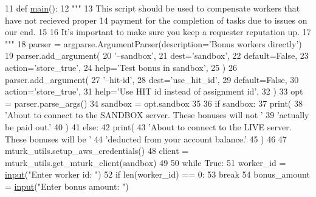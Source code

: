 \begin{DoxyCode}
11 \textcolor{keyword}{def }\hyperlink{namespaceparlai_1_1mturk_1_1scripts_1_1bonus__workers_aafc7a350f4abb5524c1b7477b3fc2bda}{main}():
12     \textcolor{stringliteral}{"""}
13 \textcolor{stringliteral}{    This script should be used to compensate workers that have not recieved proper}
14 \textcolor{stringliteral}{    payment for the completion of tasks due to issues on our end.}
15 \textcolor{stringliteral}{}
16 \textcolor{stringliteral}{    It's important to make sure you keep a requester reputation up.}
17 \textcolor{stringliteral}{    """}
18     parser = argparse.ArgumentParser(description=\textcolor{stringliteral}{'Bonus workers directly'})
19     parser.add\_argument(
20         \textcolor{stringliteral}{'--sandbox'},
21         dest=\textcolor{stringliteral}{'sandbox'},
22         default=\textcolor{keyword}{False},
23         action=\textcolor{stringliteral}{'store\_true'},
24         help=\textcolor{stringliteral}{'Test bonus in sandbox'},
25     )
26     parser.add\_argument(
27         \textcolor{stringliteral}{'--hit-id'},
28         dest=\textcolor{stringliteral}{'use\_hit\_id'},
29         default=\textcolor{keyword}{False},
30         action=\textcolor{stringliteral}{'store\_true'},
31         help=\textcolor{stringliteral}{'Use HIT id instead of assignment id'},
32     )
33     opt = parser.parse\_args()
34     sandbox = opt.sandbox
35 
36     \textcolor{keywordflow}{if} sandbox:
37         print(
38             \textcolor{stringliteral}{'About to connect to the SANDBOX server. These bonuses will not '}
39             \textcolor{stringliteral}{'actually be paid out.'}
40         )
41     \textcolor{keywordflow}{else}:
42         print(
43             \textcolor{stringliteral}{'About to connect to the LIVE server. These bonuses will be '}
44             \textcolor{stringliteral}{'deducted from your account balance.'}
45         )
46 
47     mturk\_utils.setup\_aws\_credentials()
48     client = mturk\_utils.get\_mturk\_client(sandbox)
49 
50     \textcolor{keywordflow}{while} \textcolor{keyword}{True}:
51         worker\_id = \hyperlink{namespaceparlai_1_1mturk_1_1core_1_1dev_1_1test_1_1test__full__system_a1e1817cd65688fb90f827834d1fb4567}{input}(\textcolor{stringliteral}{"Enter worker id: "})
52         \textcolor{keywordflow}{if} len(worker\_id) == 0:
53             \textcolor{keywordflow}{break}
54         bonus\_amount = \hyperlink{namespaceparlai_1_1mturk_1_1core_1_1dev_1_1test_1_1test__full__system_a1e1817cd65688fb90f827834d1fb4567}{input}(\textcolor{stringliteral}{"Enter bonus amount: "})

\end{DoxyCode}
